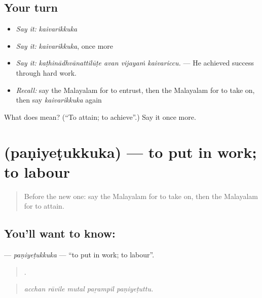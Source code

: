 \subsection*{Your turn}
\begin{itemize}
\raggedright
  \item \emph{Say it:} \emph{kaivarikkuka}
  \item \emph{Say it:} \emph{kaivarikkuka}, once more
  \item \emph{Say it:} \emph{kaṭhinādhvānattilūṭe avan vijayaṁ kaivariccu.} — He achieved success through hard work.
  \item \emph{Recall:} say the Malayalam for to entrust, then the Malayalam for to take on, then say \emph{kaivarikkuka} again
\end{itemize}

\begin{tcolorbox}[breakable,colback=teal!4,colframe=teal!35!black,title={Before you move on}]
What does  mean? (\textquotedblleft{}To attain; to achieve\textquotedblright{}.) Say it once more.
\end{tcolorbox}
\section[\texorpdfstring{\ml{പണിയെടുക്കുക} (paṇiyeṭukkuka)}{പണിയെടുക്കുക (paṇiyeṭukkuka)}]{ (paṇiyeṭukkuka) — to put in work; to labour}

\label{lesson:ML-C551-paniyetukkuka}



\begin{quote}
Before the new one: say the Malayalam for to take on, then the Malayalam for to attain.
\end{quote}

\subsection*{You'll want to know: }
\textbf{} — \emph{paṇiyeṭukkuka} — \textquotedblleft{}to put in work; to labour\textquotedblright{}.

\begin{quote}
    .
\end{quote}

\begin{quote}
\emph{acchan rāvile mutal paṟampil paṇiyeṭuttu.}
\end{quote}

